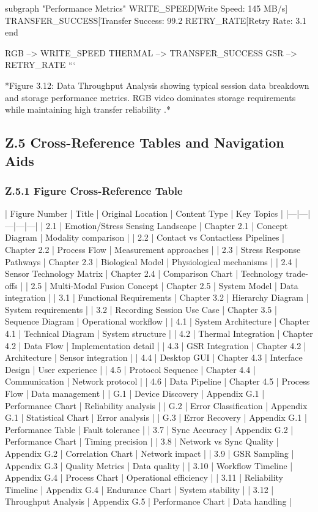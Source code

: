     subgraph "Performance Metrics"
        WRITE_SPEED[Write Speed: 145 MB/s]
        TRANSFER_SUCCESS[Transfer Success: 99.2%
        RETRY_RATE[Retry Rate: 3.1%
    end

    RGB --> WRITE_SPEED
    THERMAL --> TRANSFER_SUCCESS
    GSR --> RETRY_RATE
```

*Figure 3.12: Data Throughput Analysis showing typical session data
breakdown and storage performance metrics. RGB video dominates storage
requirements while maintaining high transfer reliability \cite{ref23}.*

\subsection{Z.5 Cross-Reference Tables and Navigation Aids}

\subsubsection{Z.5.1 Figure Cross-Reference Table}

| Figure Number | Title | Original Location | Content Type | Key Topics |
|---|---|---|---|---|
| 2.1 | Emotion/Stress Sensing Landscape | Chapter 2.1 | Concept Diagram | Modality comparison |
| 2.2 | Contact vs Contactless Pipelines | Chapter 2.2 | Process Flow | Measurement approaches |
| 2.3 | Stress Response Pathways | Chapter 2.3 | Biological Model | Physiological mechanisms |
| 2.4 | Sensor Technology Matrix | Chapter 2.4 | Comparison Chart | Technology trade-offs |
| 2.5 | Multi-Modal Fusion Concept | Chapter 2.5 | System Model | Data integration |
| 3.1 | Functional Requirements | Chapter 3.2 | Hierarchy Diagram | System requirements |
| 3.2 | Recording Session Use Case | Chapter 3.5 | Sequence Diagram | Operational workflow |
| 4.1 | System Architecture | Chapter 4.1 | Technical Diagram | System structure |
| 4.2 | Thermal Integration | Chapter 4.2 | Data Flow | Implementation detail |
| 4.3 | GSR Integration | Chapter 4.2 | Architecture | Sensor integration |
| 4.4 | Desktop GUI | Chapter 4.3 | Interface Design | User experience |
| 4.5 | Protocol Sequence | Chapter 4.4 | Communication | Network protocol |
| 4.6 | Data Pipeline | Chapter 4.5 | Process Flow | Data management |
| G.1 | Device Discovery | Appendix G.1 | Performance Chart | Reliability analysis |
| G.2 | Error Classification | Appendix G.1 | Statistical Chart | Error analysis |
| G.3 | Error Recovery | Appendix G.1 | Performance Table | Fault tolerance |
| 3.7 | Sync Accuracy | Appendix G.2 | Performance Chart | Timing precision |
| 3.8 | Network vs Sync Quality | Appendix G.2 | Correlation Chart | Network impact |
| 3.9 | GSR Sampling | Appendix G.3 | Quality Metrics | Data quality |
| 3.10 | Workflow Timeline | Appendix G.4 | Process Chart | Operational efficiency |
| 3.11 | Reliability Timeline | Appendix G.4 | Endurance Chart | System stability |
| 3.12 | Throughput Analysis | Appendix G.5 | Performance Chart | Data handling |

